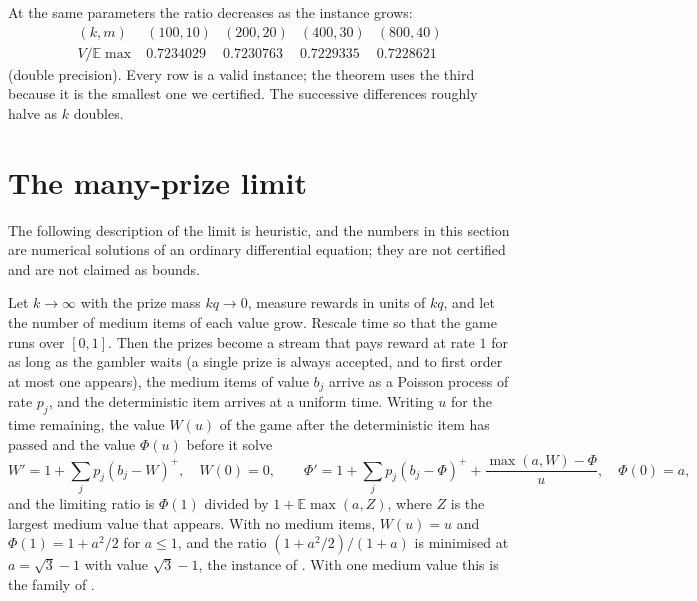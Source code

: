 \documentclass[11pt]{amsart}
\theoremstyle{remark}\newtheorem{remark}[theorem]{Remark}
\newcommand{\E}{\mathbb{E}}
\begin{document}
At the same parameters the ratio decreases as the instance grows:
\[
\begin{array}{c|cccc}
(k,m) & (100,10) & (200,20) & (400,30) & (800,40)\\\hline
V/\E\max & 0.7234029 & 0.7230763 & 0.7229335 & 0.7228621
\end{array}
\]
(double precision). Every row is a valid instance; the theorem uses the third because it is the smallest one we
certified. The successive differences roughly halve as $k$ doubles.

\section{The many-prize limit}\label{sec:limit}

The following description of the limit is heuristic, and the numbers in this section are numerical solutions of an
ordinary differential equation; they are not certified and are not claimed as bounds.

Let $k\to\infty$ with the prize mass $kq\to0$, measure rewards in units of $kq$, and let the number of medium items of
each value grow. Rescale time so that the game runs over $[0,1]$. Then the prizes become a stream that pays reward at
rate $1$ for as long as the gambler waits (a single prize is always accepted, and to first order at most one appears),
the medium items of value $b_j$ arrive as a Poisson process of rate $p_j$, and the deterministic item arrives at a
uniform time. Writing $u$ for the time remaining, the value $W(u)$ of the game after the deterministic item has passed and
the value $\Phi(u)$ before it solve
\[
W'=1+\sum_jp_j(b_j-W)^+,\quad W(0)=0,\qquad
\Phi'=1+\sum_jp_j(b_j-\Phi)^++\frac{\max(a,W)-\Phi}{u},\quad \Phi(0)=a,
\]
and the limiting ratio is $\Phi(1)$ divided by $1+\E\max(a,Z)$, where $Z$ is the largest medium value that appears. With
no medium items, $W(u)=u$ and $\Phi(1)=1+a^2/2$ for $a\le1$, and the ratio $(1+a^2/2)/(1+a)$ is minimised at $a=\sqrt3-1$
with value $\sqrt3-1$, the instance of \cite{csz}. With one medium value this is the family of \cite{gms}.
\end{document}
